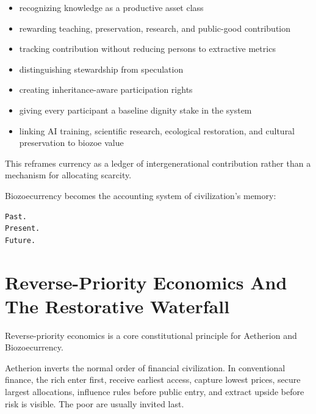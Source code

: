 ﻿\documentclass[12pt]{article}
\begin{document}
\begin{itemize}
  \item recognizing knowledge as a productive asset class
\end{itemize}
\begin{itemize}
  \item rewarding teaching, preservation, research, and public-good contribution
\end{itemize}
\begin{itemize}
  \item tracking contribution without reducing persons to extractive metrics
\end{itemize}
\begin{itemize}
  \item distinguishing stewardship from speculation
\end{itemize}
\begin{itemize}
  \item creating inheritance-aware participation rights
\end{itemize}
\begin{itemize}
  \item giving every participant a baseline dignity stake in the system
\end{itemize}
\begin{itemize}
  \item linking AI training, scientific research, ecological restoration, and cultural preservation to biozoe value
\end{itemize}

This reframes currency as a ledger of intergenerational contribution rather than a mechanism for allocating scarcity.

Biozoecurrency becomes the accounting system of civilization's memory:

\begin{verbatim}
Past.
Present.
Future.
\end{verbatim}

\section{Reverse-Priority Economics And The Restorative Waterfall}


Reverse-priority economics is a core constitutional principle for Aetherion and Biozoecurrency.

Aetherion inverts the normal order of financial civilization. In conventional finance, the rich enter first, receive earliest access, capture lowest prices, secure largest allocations, influence rules before public entry, and extract upside before risk is visible. The poor are usually invited last.
\end{document}
